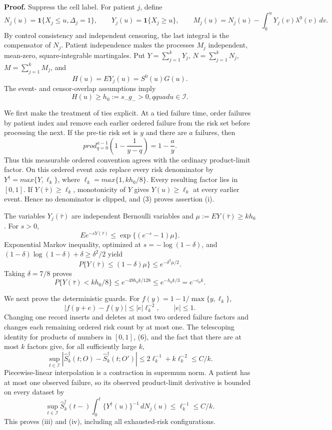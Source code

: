 \textbf{Proof.}
Suppress the cell label.  For patient \(j\), define
\[
 N_j(u)=\mathbf 1\{X_j\leq u,\Delta_j=1\},\qquad
 Y_j(u)=\mathbf 1\{X_j\geq u\},\qquad
 M_j(u)=N_j(u)-\int_0^uY_j(v)\lambda^0(v)\,dv.             \tag{1}
\]
By control consistency and independent censoring, the last integral is the
compensator of \(N_j\).  Patient independence makes the processes \(M_j\)
independent, mean-zero, square-integrable martingales.  Put
\(Y=\sum_{j=1}^kY_j\), \(N=\sum_{j=1}^kN_j\),
\(M=\sum_{j=1}^kM_j\), and
\[
 H(u)=E Y_j(u)=S^0(u)G(u).
\]
The event- and censor-overlap assumptions imply
\[
 H(u)\geq h_0:=s_-g_->0,qquad u\in\mathcal I.             \tag{2}
\]

We first make the treatment of ties explicit.  At a tied failure time, order
failures by patient index and remove each earlier ordered failure from the risk
set before processing the next.  If the pre-tie risk set is \(y\) and there are
\(a\) failures, then
\[
 prod_{q=0}^{a-1}\left(1-\frac{1}{y-q}\right)=1-\frac{a}{y}. \tag{3}
\]
Thus this measurable ordered convention agrees with the ordinary product-limit
factor.  On this ordered event axis replace every risk denominator by
\(Y^\dagger=max\{Y,\ell_k\}\), where
\(\ell_k=max\{1,kh_0/8\}\).  Every resulting factor lies in \([0,1]\).
If \(Y(\bar\tau)\geq\ell_k\), monotonicity of \(Y\) gives
\(Y(u)\geq\ell_k\) at every earlier event.  Hence no denominator is clipped,
and (3) proves assertion (i).

The variables \(Y_j(\bar\tau)\) are independent Bernoulli variables and
\(\mu:=E Y(\bar\tau)\geq kh_0\).  For \(s>0\),
\[
 E e^{-sY(\bar\tau)}
 \leq \exp\{(e^{-s}-1)\mu\}.
\]
Exponential Markov inequality, optimized at
\(s=-\log(1-\delta)\), and
\((1-\delta)\log(1-\delta)+\delta\geq\delta^2/2\) yield
\[
 P\{Y(\bar\tau)\leq(1-\delta)\mu\}
 \leq e^{-\delta^2\mu/2}.                                 \tag{4}
\]
Taking \(\delta=7/8\) proves
\[
 P\{Y(\bar\tau)<kh_0/8\}
 \leq e^{-49h_0k/128}
 \leq e^{-h_0k/3}=e^{-c_0k}.                              \tag{5}
\]

We next prove the deterministic guards.  For
\(f(y)=1-1/\max\{y,\ell_k\}\),
\[
 |f(y+e)-f(y)|\leq |e|\ell_k^{-2},\qquad |e|\leq1.        \tag{6}
\]
Changing one record inserts and deletes at most two ordered failure factors and
changes each remaining ordered risk count by at most one.  The telescoping
identity for products of numbers in \([0,1]\), (6), and the fact that there are
at most \(k\) factors give, for all sufficiently large \(k\),
\[
 \sup_{t\in\mathcal I}
 |\widehat S_k^\dagger(t;O)-\widehat S_k^\dagger(t;O')|
 \leq 2\ell_k^{-1}+k\ell_k^{-2}\leq C/k.                 \tag{7}
\]
Piecewise-linear interpolation is a contraction in supremum norm.  A patient
has at most one observed failure, so its observed product-limit derivative is
bounded on every dataset by
\[
 \sup_{t\in\mathcal I}\widehat S_k^\dagger(t-)
 \int_0^t\{Y^\dagger(u)\}^{-1}\,dN_j(u)
 \leq\ell_k^{-1}\leq C/k.                                \tag{8}
\]
This proves (iii) and (iv), including all exhausted-risk configurations.

